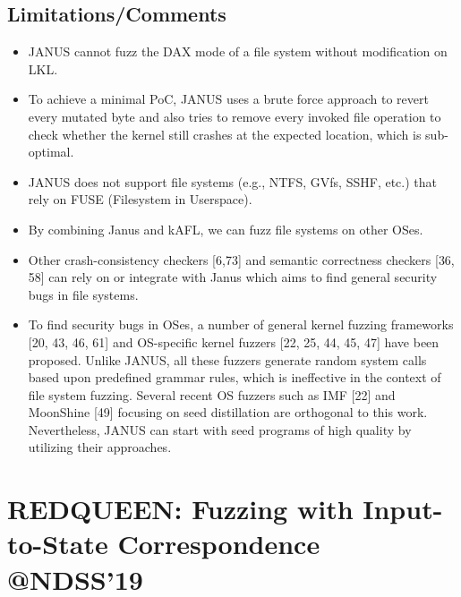 \subsection{Limitations/Comments}
\begin{itemize}
    \item JANUS cannot fuzz the DAX mode of a file system without modification on LKL. 
    \item To achieve a minimal PoC, JANUS uses a brute force approach to revert every mutated byte and also tries to remove every invoked file operation to check whether the kernel still crashes at the expected location, which is sub-optimal.
    \item JANUS does not support file systems (e.g., NTFS, GVfs, SSHF, etc.) that rely on FUSE (Filesystem in Userspace).
    \item By combining Janus and kAFL, we can fuzz file systems on other OSes.
    \item Other crash-consistency checkers [6,73] and semantic correctness checkers [36, 58] can rely on or integrate with Janus which aims to find general security bugs in file systems.
    \item To find security bugs in OSes, a number of general kernel fuzzing frameworks [20, 43, 46, 61] and OS-specific kernel fuzzers [22, 25, 44, 45, 47] have been proposed. Unlike JANUS, all these fuzzers generate random system calls based upon predefined grammar rules, which is ineffective in the context of file system fuzzing. Several recent OS fuzzers such as IMF [22] and MoonShine [49] focusing on seed distillation are orthogonal to this work. Nevertheless, JANUS can start with seed programs of high quality by utilizing their approaches.
\end{itemize}
\newpage

\section{REDQUEEN: Fuzzing with Input-to-State Correspondence @NDSS'19}
